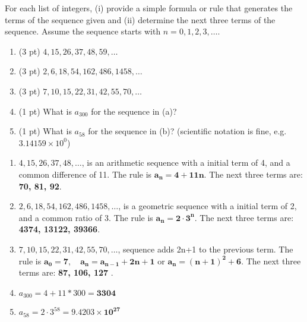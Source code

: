 \documentclass[12pt,addpoints]{exam}
\begin{document}
\begin{questions}
\printanswers

\question[11]\label{prob1} For each list of integers, (i) provide a simple formula or rule that generates the terms of the sequence given and (ii) determine the next three terms of the sequence.  Assume the sequence starts with $n=0, 1, 2, 3, \ldots$.
	\begin{enumerate}[label=(\alph*),topsep=0pt,itemsep=0pt,parsep=0pt]
		\item (3 pt) $4, 15, 26, 37, 48, 59, \ldots $
		\item (3 pt) $2, 6, 18, 54, 162, 486, 1458, \ldots $
		\item (3 pt) $7, 10, 15, 22, 31, 42, 55, 70, \ldots $
		\item (1 pt) What is $a_{300}$ for the sequence in (a)?
		\item (1 pt) What is $a_{58}$ for the sequence in (b)?  (scientific notation is fine, e.g.  $3.14159 \times 10^{0}$)
	\end{enumerate}
    \ifprintanswers
        \vspace{-10pt}
   \fi
\begin{solution}
	\begin{enumerate}[label=(\alph*),topsep=0pt,itemsep=0pt,parsep=0pt]
		\item  $4, 15, 26, 37, 48, \ldots $, is an arithmetic sequence with a initial term of 4, and a common difference of 11.  The rule is $\mathbf{a_n = 4 + 11n}$.  The next three terms are: \textbf{70, 81, 92}.
		\item $2, 6, 18, 54, 162, 486, 1458, \ldots $, is a geometric sequence with a initial term of 2, and a common ratio of 3.  The rule is $\mathbf{a_n = 2\cdot3^n}$.  The next three terms are: \textbf{4374, 13122, 39366}.
		\item $7, 10, 15, 22, 31, 42, 55, 70, \ldots $, sequence adds 2n+1 to the previous term.  The rule is $\mathbf{a_0 = 7, \quad a_n = a_{n-1} + 2n + 1}$ or $\mathbf{a_n = (n+1)^2 + 6}$.  The next three terms are: \textbf{ 87, 106, 127 }. 
		\item $a_{300} = 4 + 11*300 = \mathbf{3304}$
		\item $a_{58} = 2\cdot3^{58} = \mathbf{9.4203 \times 10^{27}}$
	\end{enumerate}
\end{solution}

 


\end{questions}
\end{document}
